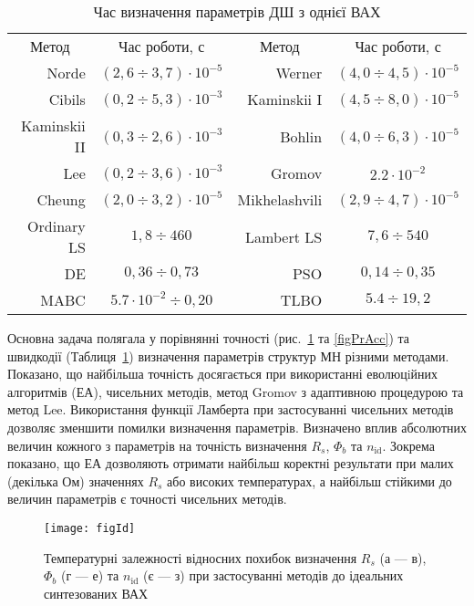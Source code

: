 \begin{table}[b]
\caption{\label{tabRT}Час визначення параметрів ДШ з однієї ВАХ}
\centering
\begin{tabular}{|r|c|r|c|}
\hline
\multicolumn{1}{|c|}{Метод}&Час роботи, с &\multicolumn{1}{c|}{Метод}&Час роботи, с\\ \hhline{|====|}
Norde &$(2,6\div3,7)\cdot10^{-5}$& Werner  &$(4,0\div4,5)\cdot10^{-5}$\\ \hline
Cibils  &$(0,2\div5,3)\cdot10^{-3}$& Kaminskii I &$(4,5\div8,0)\cdot10^{-5}$\\ \hline
Kaminskii II &$(0,3\div2,6)\cdot10^{-3}$& Bohlin &$(4,0\div6,3)\cdot10^{-5}$\\ \hline
Lee &$(0,2\div3,6)\cdot10^{-3}$& Gromov &$2.2\cdot10^{-2}$\\ \hline
Cheung &$(2,0\div3,2)\cdot10^{-5}$&Mikhelashvili &$(2,9\div4,7)\cdot10^{-5}$\\ \hline
Ordinary LS &$1,8\div460$&Lambert LS &$7,6\div540$\\ \hline
DE &$0,36\div0,73$&PSO &$0,14\div0,35$\\ \hline
MABC &$5.7\cdot10^{-2}\div0,20$&TLBO &$5.4\div19,2$ \\
\hline
\end{tabular}
\end{table}

Основна задача полягала у порівнянні точності (рис.~\ref{figId} та \ref{figPrAcc}) та швидкодії (Таблиця~\ref{tabRT}) визначення параметрів структур МН різними методами.
Показано, що найбільша точність досягається при використанні еволюцiйних алгоритмів (ЕА), чисельних методів, метод Gromov з адаптивною процедурою та метод Lee.
Використання функції Ламберта при застосуванні чисельних методів дозволяє зменшити помилки визначення параметрів.
Визначено вплив абсолютних величин кожного з параметрів на точність визначення $R_s$, $\Phi_b$ та $n_\mathrm{id}$.
Зокрема показано, що ЕА дозволяють отримати найбільш коректні результати при малих (декілька Ом) значеннях $R_s$ або високих температурах, а найбільш стійкими до величин параметрів є точності чисельних методів.


\begin{figure}
\center
\texttt{[image: figId]}%
\caption{\label{figId}
Температурні залежності відносних похибок визначення $R_s$ (а --- в), $\Phi_b$ (г --- е) та $n_\mathrm{id}$ (є --- з) при застосуванні методів до ідеальних синтезованих ВАХ
}
\end{figure}


